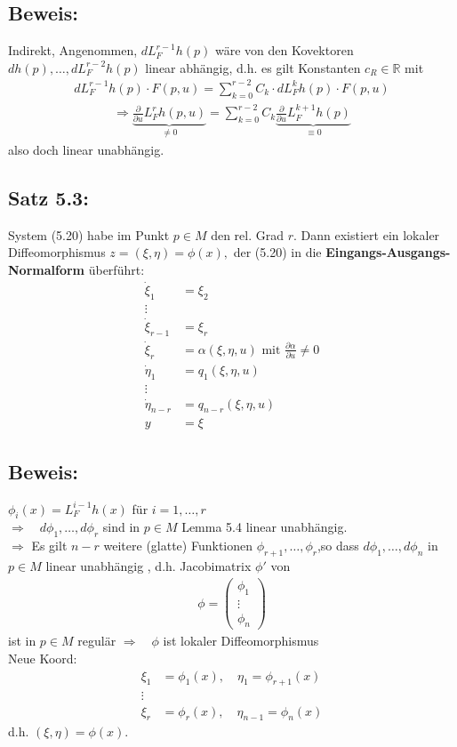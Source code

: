 \documentclass[ngerman]{tudscrreprt}
\begin{document}
\subsection*{Beweis: } Indirekt, Angenommen, $dL_F^{r-1} h(p) $ wäre von den Kovektoren $dh(p),\dots, dL_F^{r-2} h(p)$ linear abhängig, d.h. es gilt Konstanten $c_{R} \in \mathbb{R} $ mit \begin{align*}
dL_F^{r-1} h(p) \cdot F(p,u) = \sum\limits_{k=0}^{r-2} C_{k}\cdot dL_F^{k} h(p) \cdot F(p,u)
\end{align*}
\begin{align*}
\Rightarrow \underbrace{\frac{\partial }{\partial u} L_F^r h(p,u)  }_{\ne 0} = \sum\limits_{k=0}^{r-2}C_k \underbrace{\frac{\partial }{\partial u} L_F^{k+1} h(p)}_{\equiv 0} 
\end{align*}
also doch linear unabhängig. 
\subsection*{Satz 5.3: } System (5.20) habe im Punkt $p\in M$ den rel. Grad $r$. Dann existiert ein lokaler Diffeomorphismus $z = (\xi, \eta) = \phi(x), $ der (5.20) in die \textbf{Eingangs-Ausgangs-Normalform} überführt:
\begin{align*}
\dot \xi_1 &= \xi_2\\ 
\vdots\\ 
\dot \xi_{r-1}&= \xi_r\\ 
\dot \xi_r &= \alpha(\xi, \eta, u) \text{ mit } \frac{\partial \alpha}{\partial u}\ne 0\\
\dot \eta_1 &= q_1(\xi, \eta, u)\\ 
\vdots\\
\dot \eta_{n-r}&=q_{n-r} (\xi, \eta, u)\\ 
y &= \xi \tag{ 5.21} 
\end{align*}
\subsection*{Beweis: } $\phi_i (x) = L_F^{i-1} h(x) $ für $i = 1,\dots, r$ \\ 
$\Rightarrow  \quad d\phi_1, \dots, d\phi_r $ sind in $p \in M$ Lemma 5.4 linear unabhängig. \\ 
$\Rightarrow$ Es gilt $n-r$ weitere (glatte) Funktionen $\phi_{r+1} , \dots, \phi_r$,so dass 
$d\phi_1, \dots, d\phi_n$ in $p\in M$ linear unabhängig , d.h. Jacobimatrix $\phi'$ von 
\begin{align*}
\phi = \begin{pmatrix}
\phi_1\\ \vdots\\ \phi_n
\end{pmatrix} 
\end{align*}ist in $p\in M $ regulär
$\Rightarrow \quad \phi $ ist lokaler Diffeomorphismus \\ 
Neue Koord: \begin{align*} \xi_1 &= \phi_1(x), \quad \eta_1 = \phi_{r+1}(x)\\
\vdots\\ 
\xi_{r} &= \phi_{r}(x),\quad \eta_{n-1} = \phi_n(x)
\end{align*}
d.h. $(\xi,\eta) = \phi(x) .$
\end{document}
